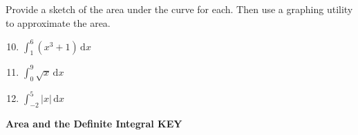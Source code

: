 \documentclass{article}
\begin{document}
Provide a sketch of the area under the curve for each. Then use a graphing utility to approximate the area.
\begin{multicols}{3}
\begin{enumerate}   \setcounter{enumi}{9}
    \item $\int_{1}^{6} (x^3 + 1) \, \mathrm{d}x$
    \item $\int_{0}^{9}\sqrt{x} \, \mathrm{d}x$
    \item $\int_{-2}^{5} |x| \, \mathrm{d}x$
\end{enumerate}
\end{multicols}
\vspace{10pt}



\newpage


\textbf{Area and the Definite Integral KEY}
\end{document}
